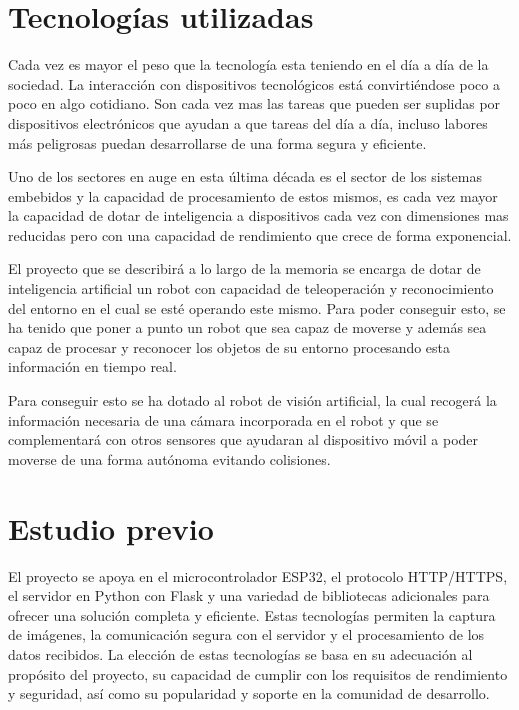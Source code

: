 
\section{Tecnologías utilizadas}
Cada vez es mayor el peso que la tecnología esta teniendo en el día a día de la sociedad. La interacción con dispositivos tecnológicos está convirtiéndose poco a poco en algo cotidiano. Son cada vez mas las tareas que pueden ser suplidas por dispositivos electrónicos que ayudan a que tareas del día a día, incluso labores más peligrosas puedan desarrollarse de una forma segura y eficiente.

Uno de los sectores en auge en esta última década es el sector de los sistemas embebidos y la capacidad de procesamiento de estos mismos, es cada vez mayor la capacidad de dotar de inteligencia a dispositivos cada vez con dimensiones mas reducidas pero con una capacidad de rendimiento que crece de forma exponencial.

El proyecto que se describirá a lo largo de la memoria se encarga de dotar de inteligencia artificial un robot con capacidad de teleoperación y reconocimiento del entorno en el cual se esté operando este mismo. Para poder conseguir esto, se ha tenido que poner a punto un robot que sea capaz de moverse y además sea capaz de procesar y reconocer los objetos de su entorno procesando esta información en tiempo real.

Para conseguir esto se ha dotado al robot de visión artificial, la cual recogerá la información necesaria de una cámara incorporada en el robot y que se complementará con otros sensores que ayudaran al dispositivo móvil a poder moverse de una forma autónoma evitando colisiones.
\section{Estudio previo}
El proyecto se apoya en el microcontrolador ESP32, el protocolo HTTP/HTTPS, el servidor en Python con Flask y una variedad de bibliotecas adicionales para ofrecer una solución completa y eficiente. Estas tecnologías permiten la captura de imágenes, la comunicación segura con el servidor y el procesamiento de los datos recibidos. La elección de estas tecnologías se basa en su adecuación al propósito del proyecto, su capacidad de cumplir con los requisitos de rendimiento y seguridad, así como su popularidad y soporte en la comunidad de desarrollo.

